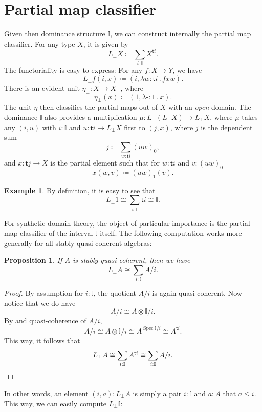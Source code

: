 \documentclass[12pt]{amsart}
\newtheorem{proposition}[theorem]{Proposition}
\theoremstyle{definition}
\newtheorem{example}[theorem]{Example}
\newcommand{\mbb}[1]{\mathbb{#1}}
\newcommand{\I}{\mbb I}
\newcommand{\ms}[1]{\mathsf{#1}}
\newcommand{\prt}{_{\bot}}
\newcommand{\ld}[2]{\lambda #1\!\colon\!\!#2\mathpunct{.}}
\newcommand{\hp}{\text{-}}
\newcommand{\spec}{\operatorname{Spec}}
\begin{document}
\section{Partial map classifier}\label{sec:lifting}
Given then dominance structure $\I$, we can construct internally the partial map classifier. For any type $X$, it is given by
\[ L\prt X \coloneq \sum_{i:\I}X^{\ms ti}. \]
The functoriality is easy to express: For any $f \colon X \to Y$, we have
\[ L\prt f(i,x) \coloneq (i,\ld{w}{\ms ti}fxw). \]
There is an evident unit $\eta\prt \colon X \to X\prt$, where
\[ \eta\prt(x) \coloneq (1,\ld\hp 1 x). \]
The unit $\eta$ then classifies the partial maps out of $X$ with an \emph{open} domain. The dominance $\I$ also provides a multiplication $\mu \colon L\prt(L\prt X) \to L\prt X$, where $\mu$ takes any $(i,u)$ with $i : \I$ and $u \colon \ms ti \to L\prt X$ first to $(j,x)$, where $j$ is the dependent sum
\[ j \coloneq \sum_{w:\ms ti} (uw)_0, \]
and $x \colon \ms tj \to X$ is the partial element such that for $w : \ms ti$ and $v : (uw)_0$
\[ x(w,v) \coloneq (uw)_1(v). \]

\begin{example}
  By definition, it is easy to see that
  \[ L\prt 1 \cong \sum_{i:\I}\ms ti \cong \I. \]
\end{example}

For synthetic domain theory, the object of particular importance is the partial map classifier of the interval $\I$ itself. The following computation works more generally for all stably quasi-coherent algebras:

\begin{proposition}\label{prop:liftingofalgebra}
  If $A$ is stably quasi-coherent, then we have
  \[ L\prt A \cong \sum_{i:\I}A/i. \]
\end{proposition}
\begin{proof}
  By assumption for $i : \I$, the quotient $A/i$ is again quasi-coherent. Now notice that we do have
  \[ A/i \cong A \otimes \I/i. \]
  By  and quasi-coherence of $A/i$, 
  \[ A/i \cong A \otimes \I/i \cong A^{\spec \I/i} \cong A^{\ms ti}. \]
  This way, it follows that 
  \[ L\prt A \cong \sum_{i:\I}A^{\ms ti} \cong \sum_{i:\I}A/i. \qedhere \]
\end{proof}

In other words, an element $(i,a) : L\prt A$ is simply a pair $i : \I$ and $a : A$ that $a \le i$. This way, we can easily compute $L\prt \I$:
\end{document}

